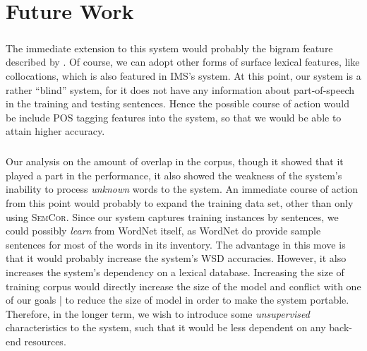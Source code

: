 \chapter{Future Work}
\label{futurework}
\paragraph{}
The immediate extension to this system would probably the bigram feature described by \cite{pederson}. Of course, we can adopt other forms of surface lexical features, like collocations, which is also featured in IMS's system. At this point, our system is a rather ``blind'' system, for it does not have any information about part-of-speech in the training and testing sentences. Hence the possible course of action would be include POS tagging features into the system, so that we would be able to attain higher accuracy.

\paragraph{}
Our analysis on the amount of overlap in the corpus, though it showed that it played a part in the performance, it also showed the weakness of the system's inability to process \textit{unknown} words to the system. An immediate course of action from this point would probably to expand the training data set, other than only using \textsc{SemCor}. Since our system captures training instances by sentences, we could possibly \textit{learn} from WordNet itself, as WordNet do provide sample sentences for most of the words in its inventory. The advantage in this move is that it would probably increase the system's WSD accuracies. However, it also increases the system's dependency on a lexical database. Increasing the size of training corpus would directly increase the size of the model and conflict with one of our goals | to reduce the size of model in order to make the system portable. Therefore, in the longer term, we wish to introduce some \textit{unsupervised} characteristics to the system, such that it would be less dependent on any back-end resources.
